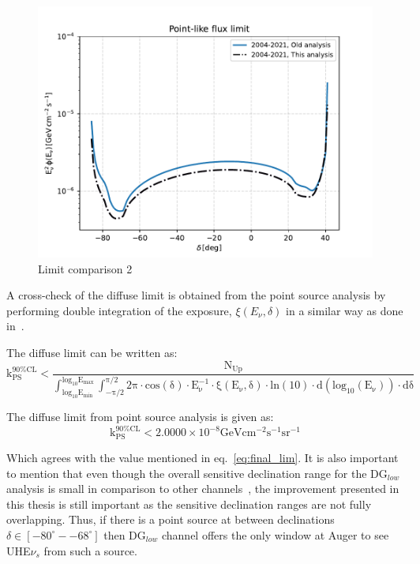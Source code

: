 \begin{figure}[t!]
  \centering
  \includegraphics[width=14.5cm]{thesis_figures/PointLimits/Point_comp_combined_2.pdf}
  \caption{Limit comparison 2}
  \label{fig:Dec_limit_comb2}
\end{figure}

A cross-check of the diffuse limit is obtained from the point source analysis by performing double integration of the exposure, $\xi(E_{\nu}, \delta)$ in a similar way as done in~\cite{gap_note_2013}.

The diffuse limit can be written as:
\begin{equation}
  \mathrm{k_{PS}^{90\%CL} < \frac{N_{Up}}{\int_{log_{10}E_{min}}^{log_{10}E_{max}} \int_{-\pi/2}^{\pi/2}2\pi \cdot cos(\delta) \cdot E_{\nu}^{-1} \cdot \xi(E_{\nu}, \delta) \cdot ln(10) \cdot d(log_{10}(E_{\nu})) \cdot d\delta}} 
\end{equation}

The diffuse limit from point source analysis is given as: 
\begin{equation}
  \mathrm{k_{PS}^{90\%CL} < 2.0000 \times 10^{-8} GeV cm^{-2} s^{-1} sr^{-1}}
\end{equation}

Which agrees with the value mentioned in eq.~\ref{eq:final_lim}. It is also important to mention that even though the overall sensitive declination range for the DG$_{low}$ analysis is small in comparison to other channels~\cite{Aab_2019_point}, the improvement presented in this thesis is still important as the sensitive declination ranges are not fully overlapping. Thus, if there is a point source at between declinations $ \delta \in [-80^{\circ}- -68^{\circ}]$ then DG$_{low}$ channel offers the only window at Auger to see UHE$\nu_s$ from such a source.  

